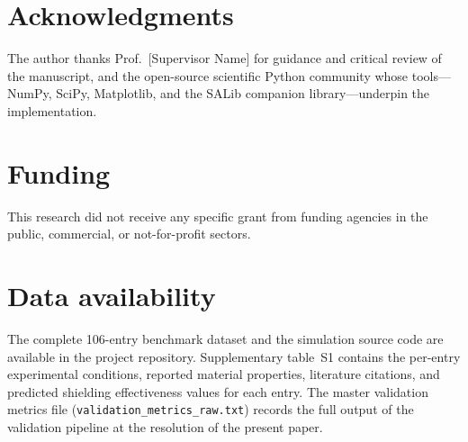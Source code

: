 \documentclass[review,3p,authoryear]{elsarticle}
\begin{document}
\section*{Acknowledgments}

The author thanks Prof.~[Supervisor Name] for guidance and critical review of the manuscript, and the open-source scientific Python community whose tools---NumPy, SciPy, Matplotlib, and the SALib companion library---underpin the implementation.

\section*{Funding}

This research did not receive any specific grant from funding agencies in the public, commercial, or not-for-profit sectors.

\section*{Data availability}

The complete \num{106}-entry benchmark dataset and the simulation source code are available in the project repository. Supplementary table~S1 contains the per-entry experimental conditions, reported material properties, literature citations, and predicted shielding effectiveness values for each entry. The master validation metrics file (\texttt{validation\_metrics\_raw.txt}) records the full output of the validation pipeline at the resolution of the present paper.

\end{document}
